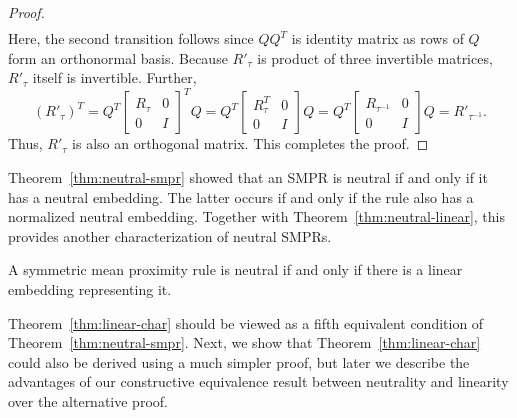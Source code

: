 \documentclass[prodmode]{acmsmall-ec14}
\begin{document}
\begin{proof}
\begin{align*}
\end{align*}
Here, the second transition follows since $Q Q^T$ is identity matrix as rows of $Q$ form an orthonormal basis. Because $R'_{\tau}$ is product of three invertible matrices, $R'_{\tau}$ itself is invertible. Further, 
$$
(R'_{\tau})^T = Q^T \left[ \begin{smallmatrix} R_{\tau} & 0 \\ 0 & I \end{smallmatrix} \right]^T Q = Q^T \left[ \begin{smallmatrix} R_{\tau}^T & 0 \\ 0 & I \end{smallmatrix} \right] Q = Q^T \left[ \begin{smallmatrix} R_{\tau^{-1}} & 0 \\ 0 & I \end{smallmatrix} \right] Q
 = R'_{\tau^{-1}}.
 $$
Thus, $R'_{\tau}$ is also an orthogonal matrix. This completes the proof. %
\end{proof}

Theorem~\ref{thm:neutral-smpr} showed that an SMPR is neutral if and only if it has a neutral embedding. The latter occurs if and only if the rule also has a normalized neutral embedding. Together with Theorem~\ref{thm:neutral-linear}, this provides another characterization of neutral SMPRs. 

\begin{theorem}
A symmetric mean proximity rule is neutral if and only if there is a linear embedding representing it.
\label{thm:linear-char}
\end{theorem}

Theorem~\ref{thm:linear-char} should be viewed as a fifth equivalent condition of Theorem~\ref{thm:neutral-smpr}. Next, we show that Theorem~\ref{thm:linear-char} could also be derived using a much simpler proof, but later we describe the advantages of our constructive equivalence result between neutrality and linearity over the alternative proof. 
\end{document}
